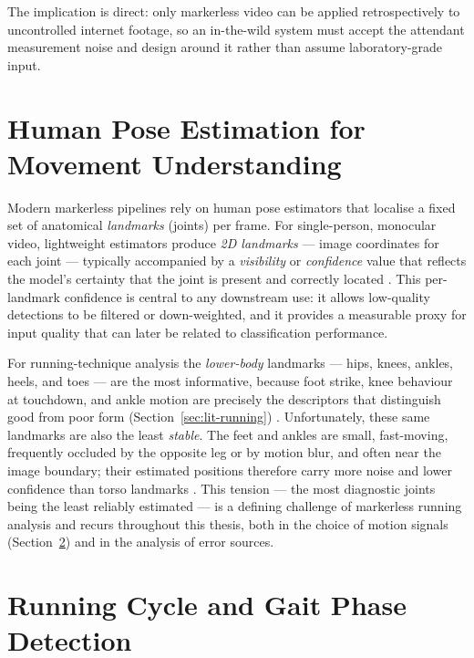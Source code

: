 The implication is direct: only markerless video can be applied retrospectively
to uncontrolled internet footage, so an in-the-wild system must accept the
attendant measurement noise and design around it rather than assume
laboratory-grade input.

\section{Human Pose Estimation for Movement Understanding}
\label{sec:lit-pose}

Modern markerless pipelines rely on human pose estimators that localise a fixed
set of anatomical \emph{landmarks} (joints) per frame. For single-person,
monocular video, lightweight estimators produce \emph{2D landmarks} --- image
coordinates for each joint --- typically accompanied by a \emph{visibility} or
\emph{confidence} value that reflects the model's certainty that the joint is
present and correctly located
\cite{cao2019openpose, lugaresi2019mediapipe, bazarevsky2020blazepose}. This
per-landmark confidence is central to any downstream use: it allows low-quality
detections to be filtered or down-weighted, and it provides a measurable proxy
for input quality that can later be related to classification performance.

For running-technique analysis the \emph{lower-body} landmarks --- hips, knees,
ankles, heels, and toes --- are the most informative, because foot strike, knee
behaviour at touchdown, and ankle motion are precisely the descriptors that
distinguish good from poor form (Section~\ref{sec:lit-running})
\cite{novacheck1998biomechanics}. Unfortunately, these same landmarks are also
the least \emph{stable}. The feet and ankles are small, fast-moving, frequently
occluded by the opposite leg or by motion blur, and often near the image
boundary; their estimated positions therefore carry more noise and lower
confidence than torso landmarks
\cite{topham2023hpesurvey, panconi2024markerless}. This tension --- the most
diagnostic joints being the least reliably estimated --- is a defining challenge
of markerless running analysis and recurs throughout this thesis, both in the
choice of motion signals (Section~\ref{sec:lit-cycle}) and in the analysis of
error sources.

\section{Running Cycle and Gait Phase Detection}
\label{sec:lit-cycle}

